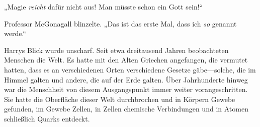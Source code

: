 „Magie \emph{reicht} dafür nicht aus! Man müsste schon ein Gott sein!“

Professor McGonagall blinzelte. „Das ist das erste Mal, dass ich \emph{so} genannt werde.“


Harrys Blick wurde unscharf. Seit etwa dreitausend Jahren beobachteten Menschen die Welt. Es hatte mit den Alten Griechen angefangen, die vermutet hatten, dass es an verschiedenen Orten verschiedene Gesetze gäbe—solche, die im Himmel galten und andere, die auf der Erde galten. Über Jahrhunderte hinweg war die Menschheit von diesem Ausgangspunkt immer weiter vorangeschritten. Sie hatte die Oberfläche dieser Welt durchbrochen und in Körpern Gewebe gefunden, im Gewebe Zellen, in Zellen chemische Verbindungen und in Atomen schließlich Quarks entdeckt.

